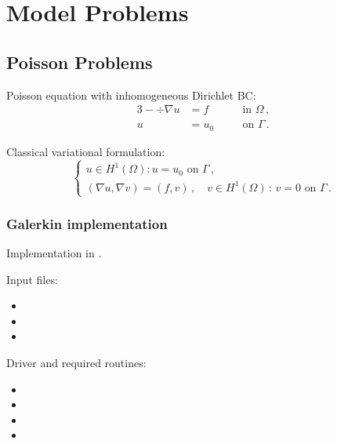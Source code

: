 %
%

\chapter{Model Problems}
\label{chap:examples}


\section{Poisson Problems}
\label{sec:poisson}

Poisson equation with inhomogeneous Dirichlet BC:
\begin{alignat*}{3}
	- \div \nabla u &= f && \quad \text{in } \Omega \, , \\
	u &= u_0 && \quad \text{on } \Gamma \, .
\end{alignat*}

Classical variational formulation:
\[
\left\{
\begin{array}{llll}
	u \in H^1(\Omega):  u = u_0 \text{ on } \Gamma \, , \\[5pt]
	(\nabla u, \nabla v) = (f,v) \, ,
	\quad v \in H^1(\Omega) \, : \, v = 0 \text{ on } \Gamma \, .
\end{array}
\right.
\]

\subsection{Galerkin implementation}
\label{subsec:poisson-galerkin}

Implementation in .

Input files:
\begin{itemize}
	\item {}
	\item {}
	\item {}
\end{itemize}

Driver and required routines:
\begin{itemize}
	\item {}
	\item {}
	\item {}
	\item {}
\end{itemize}

